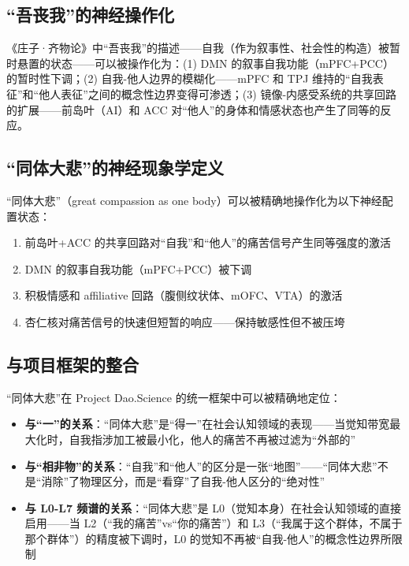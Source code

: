 \documentclass[UTF8,12pt,a4paper]{ctexart}
\begin{document}
\subsection{``吾丧我''的神经操作化}

《庄子·齐物论》中``吾丧我''的描述——自我（作为叙事性、社会性的构造）被暂时悬置的状态——可以被操作化为：(1) DMN 的叙事自我功能（mPFC+PCC）的暂时性下调；(2) 自我-他人边界的模糊化——mPFC 和 TPJ 维持的``自我表征''和``他人表征''之间的概念性边界变得可渗透；(3) 镜像-内感受系统的共享回路的扩展——前岛叶（AI）和 ACC 对``他人''的身体和情感状态也产生了同等的反应。

\subsection{``同体大悲''的神经现象学定义}

``同体大悲''（great compassion as one body）可以被精确地操作化为以下神经配置状态：

\begin{enumerate}[nosep]
    \item 前岛叶+ACC 的共享回路对``自我''和``他人''的痛苦信号产生同等强度的激活
    \item DMN 的叙事自我功能（mPFC+PCC）被下调
    \item 积极情感和 affiliative 回路（腹侧纹状体、mOFC、VTA）的激活
    \item 杏仁核对痛苦信号的快速但短暂的响应——保持敏感性但不被压垮
\end{enumerate}

\subsection{与项目框架的整合}

``同体大悲''在 Project Dao.Science 的统一框架中可以被精确地定位：

\begin{itemize}[nosep]
    \item \textbf{与``一''的关系}：``同体大悲''是``得一''在社会认知领域的表现——当觉知带宽最大化时，自我指涉加工被最小化，他人的痛苦不再被过滤为``外部的''
    \item \textbf{与``相非物''的关系}：``自我''和``他人''的区分是一张``地图''——``同体大悲''不是``消除''了物理区分，而是``看穿''了自我-他人区分的``绝对性''
    \item \textbf{与 L0-L7 频谱的关系}：``同体大悲''是 L0（觉知本身）在社会认知领域的直接启用——当 L2（``我的痛苦''vs``你的痛苦''）和 L3（``我属于这个群体，不属于那个群体''）的精度被下调时，L0 的觉知不再被``自我-他人''的概念性边界所限制
\end{itemize}
\end{document}
